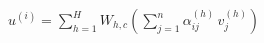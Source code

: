 \documentclass[preview]{standalone}
\begin{document}
\begin{align*}
u^{(i)} = \sum_{h=1}^{H} W_{h,c} \left(\sum_{j=1}^{n} \alpha_{ij}^{(h)}\, v_j^{(h)}\right)
\end{align*}
\end{document}
